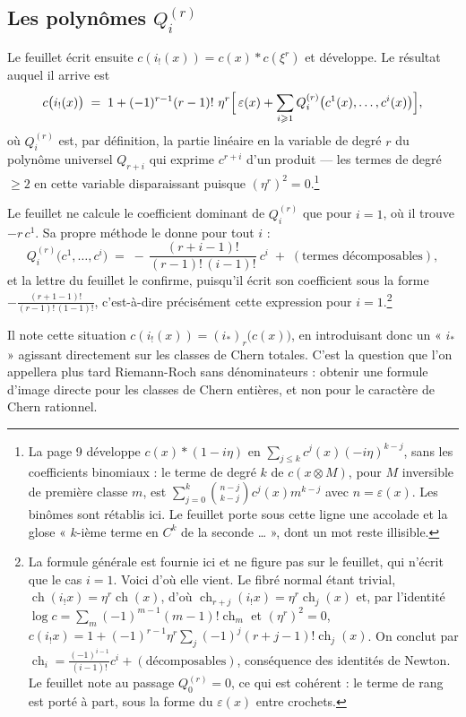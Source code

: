 \documentclass[11pt,a4paper]{article}
\begin{document}
\subsection*{Les polynômes $Q^{(r)}_{i}$}

Le feuillet écrit ensuite $c(i_{!}(x)) = c(x) \ast c(\xi^{r})$ et développe. Le
résultat auquel il arrive est
\[
  c\bigl(i_{!}(x)\bigr) \;=\; 1 + (-1)^{r-1}(r-1)!\ \eta^{r}
  \Bigl[\, \varepsilon(x) + \sum_{i \geqslant 1}
  Q^{(r)}_{i}\bigl(c^{1}(x), \ldots, c^{i}(x)\bigr) \Bigr],
\]
où $Q^{(r)}_{i}$ est, par définition, la partie linéaire en la variable de
degré $r$ du polynôme universel $Q_{r+i}$ qui exprime $c^{r+i}$ d'un produit ---
les termes de degré $\geqslant 2$ en cette variable disparaissant puisque
$(\eta^{r})^{2} = 0$.\footnote{La page 9 développe $c(x) \ast (1 - i\eta)$ en
$\sum_{j \leqslant k} c^{j}(x)(-i\eta)^{k-j}$, sans les coefficients
binomiaux : le terme de degré $k$ de $c(x \otimes M)$, pour $M$ inversible de
première classe $m$, est $\sum_{j=0}^{k}\binom{n-j}{k-j} c^{j}(x) m^{k-j}$ avec
$n = \varepsilon(x)$. Les binômes sont rétablis ici. Le feuillet porte sous
cette ligne une accolade et la glose « $k$-ième terme en $C^{k}$ de la
seconde \ldots{} », dont un mot reste illisible.}

Le feuillet ne calcule le coefficient dominant de $Q^{(r)}_{i}$ que pour
$i = 1$, où il trouve $-r\,c^{1}$. Sa propre méthode le donne pour tout $i$ :
\[
  Q^{(r)}_{i}\bigl(c^{1}, \ldots, c^{i}\bigr)
  \;=\; -\,\frac{(r+i-1)!}{(r-1)!\,(i-1)!}\ c^{i}
  \;+\; (\text{termes décomposables}),
\]
et la lettre du feuillet le confirme, puisqu'il écrit son coefficient sous la
forme $-\frac{(r+1-1)!}{(r-1)!\,(1-1)!}$, c'est-à-dire précisément cette
expression pour $i = 1$.\footnote{La formule générale est fournie ici et ne
figure pas sur le feuillet, qui n'écrit que le cas $i=1$. Voici d'où elle
vient. Le fibré normal étant trivial, $\operatorname{ch}(i_{!}x) = \eta^{r}
\operatorname{ch}(x)$, d'où $\operatorname{ch}_{r+j}(i_{!}x) = \eta^{r}
\operatorname{ch}_{j}(x)$ et, par l'identité $\log c = \sum_{m}(-1)^{m-1}(m-1)!
\operatorname{ch}_{m}$ et $(\eta^{r})^{2} = 0$,
$c(i_{!}x) = 1 + (-1)^{r-1}\eta^{r}\sum_{j}(-1)^{j}(r+j-1)!\operatorname{ch}_{j}(x)$.
On conclut par $\operatorname{ch}_{i} = \frac{(-1)^{i-1}}{(i-1)!}c^{i} +
(\text{décomposables})$, conséquence des identités de Newton. Le feuillet note
au passage $Q^{(r)}_{0} = 0$, ce qui est cohérent : le terme de rang est porté
à part, sous la forme du $\varepsilon(x)$ entre crochets.}

Il note cette situation $c(i_{!}(x)) = (i_{*})_{r}\bigl(c(x)\bigr)$, en
introduisant donc un « $i_{*}$ » agissant directement sur les classes de Chern
totales. C'est la question que l'on appellera plus tard Riemann-Roch sans
dénominateurs : obtenir une formule d'image directe pour les classes de Chern
entières, et non pour le caractère de Chern rationnel.
\end{document}
